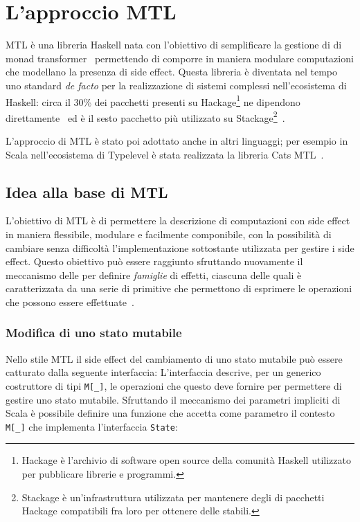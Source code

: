 \section{L'approccio MTL}

\acf{MTL} è una libreria Haskell nata con l'obiettivo di semplificare la gestione di  di monad transformer~\cite{cit:mtl} permettendo di comporre in maniera modulare computazioni che modellano la presenza di side effect.
Questa libreria è diventata nel tempo uno standard \emph{de facto} per la realizzazione di sistemi complessi nell'ecosistema di Haskell: circa il 30\% dei pacchetti presenti su Hackage\footnote{Hackage è l'archivio di software open source della comunità Haskell utilizzato per pubblicare librerie e programmi.} ne dipendono direttamente~\cite{cit:which-monads-haskell-developers-use-an-exploratory-study} ed è il sesto pacchetto più utilizzato su Stackage\footnote{Stackage è un'infrastruttura utilizzata per mantenere degli  di pacchetti Hackage compatibili fra loro per ottenere delle  stabili.}~\cite{cit:evolution-of-a-haskell-repository-and-its-use-of-monads-an-exploratory-study-of-stackage}.

L'approccio di \ac{MTL} è stato poi adottato anche in altri linguaggi; per esempio in Scala nell'ecosistema di Typelevel è stata realizzata la libreria Cats MTL~\cite{cit:cats-mtl}.

\subsection{Idea alla base di MTL}
L'obiettivo di \ac{MTL} è di permettere la descrizione di computazioni con side effect in maniera flessibile, modulare e facilmente componibile, con la possibilità di cambiare senza difficoltà l'implementazione sottostante utilizzata per gestire i side effect.
Questo obiettivo può essere raggiunto sfruttando nuovamente il meccanismo delle  per definire \emph{famiglie} di effetti, ciascuna delle quali è caratterizzata da una serie di primitive che permettono di esprimere le operazioni che possono essere effettuate~\cite{cit:functional-programming-with-overloading-and-higher-order-polymorphism}.

\subsubsection{Modifica di uno stato mutabile}
Nello stile \ac{MTL} il side effect del cambiamento di uno stato mutabile può essere catturato dalla seguente interfaccia:
L'interfaccia descrive, per un generico costruttore di tipi \lstinline{M[_]}, le operazioni che questo deve fornire per permettere di gestire uno stato mutabile.
Sfruttando il meccanismo dei parametri impliciti di Scala è possibile definire una funzione che accetta come parametro il contesto \lstinline{M[_]} che implementa l'interfaccia \lstinline{State}:

